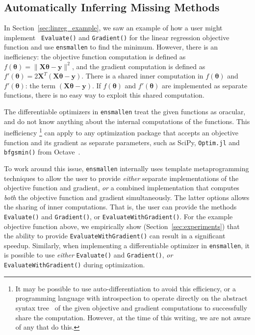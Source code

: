 \subsection{Automatically Inferring Missing Methods}
\label{sec:automatic}

In Section~\ref{sec:linreg_example}, we saw an example of how a user might implement {\tt
Evaluate()} and {\tt Gradient()} for the linear regression objective function
and use {\tt ensmallen} to find the minimum.
However, there is an inefficiency:
the objective function computation is defined as $f(\bm \theta) = \| \bm X \bm \theta - \bm y \|^2$,
and the gradient computation is defined as $f'(\bm \theta) = 2 \bm X^T (\bm X \bm \theta - \bm y)$.
There is a shared inner computation in $f(\bm \theta)$ and $f'(\bm \theta)$: the
term $(\bm X \bm \theta - \bm y)$.
If $f(\bm \theta)$ and $f'(\bm \theta)$ are implemented as separate functions,
there is no easy way to exploit this shared computation.

The differentiable optimizers in {\tt ensmallen} treat the given functions as oracular,
and do not know anything about the internal computations of the functions.
This inefficiency%
\footnote
  {It may be possible to use auto-differentiation to avoid this efficiency,
  or a programming language with introspection to operate directly on the
  abstract syntax tree~\cite{TODO}  of the given objective and gradient
  computations to successfully share the computation.  However, at the time of
  this writing, we are not aware of any that do this.
  }
can apply to any optimization package that accepts an objective
function and its gradient as separate parameters,
such as SciPy, {\tt Optim.jl} and {\tt bfgsmin()} from Octave~\cite{TODO}.

To work around this issue, {\tt ensmallen} internally uses template metaprogramming techniques to allow
the user to provide {\it either} separate implementations of the objective
function and gradient, {\it or} a combined implementation that computes {\it
both} the objective function and gradient simultaneously.
The latter options allows the sharing of inner computations.
That is, the user can provide the methods {\tt Evaluate()} and {\tt Gradient()},
or {\tt EvaluateWithGradient()}.
For the example objective function above,
we empirically show (Section~\ref{sec:experiments}) that the ability to provide
{\tt EvaluateWithGradient()} can result in a significant speedup.
Similarly, when implementing a differentiable optimizer in {\tt ensmallen},
it is possible to use {\it either} {\tt Evaluate()} and {\tt Gradient()},
{\it or} {\tt EvaluateWithGradient()} during optimization.

